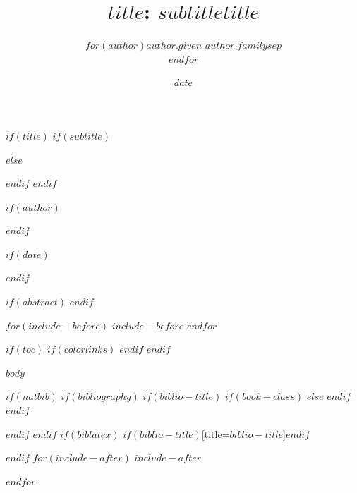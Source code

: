 \documentclass[$if(fontsize)$$fontsize$,$endif$$if(lang)$$babel-lang$,$endif$$if(papersize)$$papersize$paper,$endif$$for(classoption)$$classoption$$sep$,$endfor$]{article}
\begin{document}
$if(title)$
$if(subtitle)$
\title{$title$: $subtitle$}
$else$
\title{$title$}
$endif$
$endif$

$if(author)$
\author{$for(author)$$author.given$ $author.family$$sep$\\$endfor$}
$endif$

$if(date)$
\date{$date$}
$endif$


\maketitle

$if(abstract)$
$endif$

$for(include-before)$
$include-before$
$endfor$

$if(toc)$
{
$if(colorlinks)$
\hypersetup{linkcolor=$if(toccolor)$$toccolor$$else$black$endif$}
$endif$
\setcounter{tocdepth}{$toc-depth$}
\tableofcontents
}
$endif$


$body$


$if(natbib)$
$if(bibliography)$
$if(biblio-title)$
$if(book-class)$
\renewcommand\bibname{$biblio-title$}
$else$
\renewcommand\refname{$biblio-title$}
$endif$
$endif$


$endif$
$endif$
$if(biblatex)$
\printbibliography$if(biblio-title)$[title=$biblio-title$]$endif$

$endif$
$for(include-after)$
$include-after$

$endfor$
\end{document}
